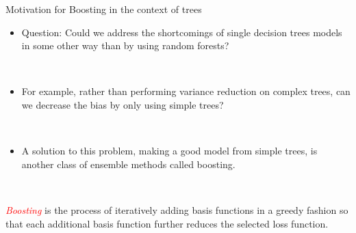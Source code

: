 \documentclass[
  10pt,
  ignorenonframetext,
]{beamer}
\providecommand{\tightlist}{%
  \setlength{\itemsep}{0pt}\setlength{\parskip}{0pt}}
\begin{document}
\begin{frame}
\begin{block}{Motivation for Boosting in the context of trees}
\protect\hypertarget{motivation-for-boosting-in-the-context-of-trees}{}
\(~\)

\begin{itemize}
\tightlist
\item
  Question: Could we address the shortcomings of single decision trees
  models in some other way than by using random forests?
\end{itemize}

\(~\)

\begin{itemize}
\tightlist
\item
  For example, rather than performing variance reduction on complex
  trees, can we decrease the bias by only using simple trees?
\end{itemize}

\(~\)

\begin{itemize}
\tightlist
\item
  A solution to this problem, making a good model from simple trees, is
  another class of ensemble methods called boosting.
\end{itemize}

\(~\)

\emph{\textcolor{red}{Boosting}} is the process of iteratively adding
basis functions in a greedy fashion so that each additional basis
function further reduces the selected loss function.
\end{block}
\end{frame}
\end{document}
